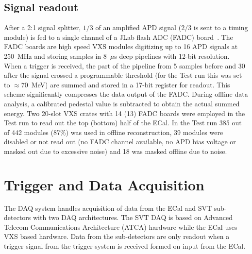 \documentclass[final,3p,times,twocolumn]{elsarticle}
\begin{document}
\subsection{Signal readout}
\label{sec:fadc}
After a 2:1 signal splitter, $1/3$ of an amplified APD signal ($2/3$ is sent to a timing module) is fed to a 
single channel of a JLab flash ADC (FADC) board~\cite{fadc}.
The FADC boards are high speed VXS modules digitizing up to 16 APD signals 
at 250~MHz and storing samples in 8~$\mu$s deep pipelines with 12-bit resolution. 
When a trigger is received, the part 
of the pipeline from 5 samples before and 30 after the signal crossed a programmable 
threshold (for the Test run this was set to $\approx70$~MeV) are 
summed and stored in a 17-bit register for readout.
This scheme significantly compresses the data output of the FADC. During offline data analysis, a 
calibrated pedestal value is subtracted to obtain the actual summed energy.
Two 20-slot VXS crates with 14 (13) FADC boards were employed in the Test run to read out the top 
(bottom) half of the ECal.
In the Test run 385 out of 442 modules (87\%) was used in offline reconstruction, 39 modules were 
disabled or not read out (no FADC channel available, no APD bias voltage or masked out due to 
excessive noise) and 18 was masked offline due to noise. 




\section{Trigger and Data Acquisition}
\label{sec:triggerdaq}

The DAQ system handles acquisition of data from the ECal and SVT sub-detectors  with 
two DAQ architectures. The SVT DAQ is based on Advanced Telecom Communications Architecture 
(ATCA) hardware while the ECal uses VXS based hardware. Data from the sub-detectors are only 
readout when a trigger signal from the trigger system is received formed on input from the ECal. 
\end{document}
